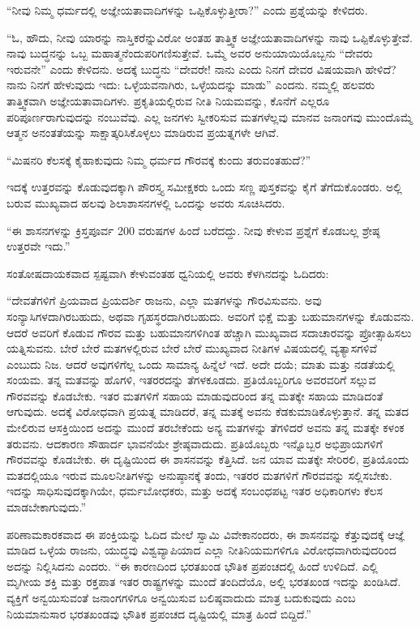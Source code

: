 “ನೀವು ನಿಮ್ಮ ಧರ್ಮದಲ್ಲಿ ಅಜ್ಞೇಯತಾವಾದಿಗಳನ್ನು ಒಪ್ಪಿಕೊಳ್ಳುತ್ತೀರಾ?” ಎಂದು ಪ್ರಶ್ನೆಯನ್ನು ಕೇಳಿದರು.

“ಓ, ಹೌದು, ನೀವು ಯಾರನ್ನು ನಾಸ್ತಿಕರೆನ್ನುವಿರೋ ಅಂತಹ ತಾತ್ತ್ವಿಕ ಅಜ್ಞೇಯತಾವಾದಿಗಳನ್ನು ನಾವು ಒಪ್ಪಿಕೊಳ್ಳುತ್ತೇವೆ. ನಾವು ಬುದ್ಧನನ್ನು ಒಬ್ಬ ಮಹಾತ್ಮನೆಂದು\break ಪರಿಗಣಿಸುತ್ತೇವೆ. ಒಮ್ಮೆ ಅವರ ಅನುಯಾಯಿಯೊಬ್ಬನು “ದೇವರು ಇರುವನೇ” ಎಂದು ಕೇಳಿದನು. ಅದಕ್ಕೆ ಬುದ್ಧನು “ದೇವರೇ! ನಾನು ಎಂದು ನಿನಗೆ ದೇವರ ವಿಷಯವಾಗಿ ಹೇಳಿದೆ? ನಾನು ನಿನಗೆ ಹೇಳುವುದು ಇದು: ಒಳ್ಳೆಯವನಾಗಿರು, ಒಳ್ಳೆಯದನ್ನು ಮಾಡು” ಎಂದನು. ನಮ್ಮಲ್ಲಿ ಹಲವರು ತಾತ್ತ್ವಿಕವಾಗಿ ಅಜ್ಞೇಯತಾವಾದಿಗಳು. ಪ್ರಕೃತಿಯಲ್ಲಿರುವ ನೀತಿ ನಿಯಮವನ್ನು, ಕೊನೆಗೆ ಎಲ್ಲರೂ ಪರಿಪೂರ್ಣರಾಗುವುದನ್ನು ನಂಬುವೆವು. ಎಲ್ಲ ಜನಗಳು ಸ್ವೀಕರಿಸುವ ಮತಗಳೆಲ್ಲವು ಮಾನವ ಜನಾಂಗವು ಮುಂದೊಮ್ಮೆ ಆತ್ಮನ ಅನಂತತೆಯನ್ನು ಸಾಕ್ಷಾತ್ಕರಿಸಿಕೊಳ್ಳಲು ಮಾಡಿರುವ ಪ್ರಯತ್ನಗಳೇ ಆಗಿವೆ.

“ಮಿಷನರಿ ಕೆಲಸಕ್ಕೆ ಕೈಹಾಕುವುದು ನಿಮ್ಮ ಧರ್ಮದ ಗೌರವಕ್ಕೆ ಕುಂದು ತರುವಂತಹುದೆ?”

ಇದಕ್ಕೆ ಉತ್ತರವನ್ನು ಕೊಡುವುದಕ್ಕಾಗಿ ಪೌರಸ್ತ್ಯ ಸಮೀಕ್ಷಕರು ಒಂದು ಸಣ್ಣ ಪುಸ್ತಕವನ್ನು ಕೈಗೆ ತೆಗೆದುಕೊಂಡರು. ಅಲ್ಲಿ ಬರುವ ಮುಖ್ಯವಾದ ಹಲವು ಶಿಲಾಶಾಸನಗಳಲ್ಲಿ ಒಂದನ್ನು ಅವರು ಸೂಚಿಸಿದರು.

“ಈ ಶಾಸನಗಳನ್ನು ಕ್ರಿಸ್ತಪೂರ್ವ 200 ವರುಷಗಳ ಹಿಂದೆ ಬರೆದದ್ದು. ನೀವು ಕೇಳುವ ಪ್ರಶ್ನೆಗೆ ಕೊಡಬಲ್ಲ ಶ್ರೇಷ್ಠ ಉತ್ತರವೇ ಇದು.”

ಸಂತೋಷದಾಯಕವಾದ ಸ್ಪಷ್ಟವಾಗಿ ಕೇಳುವಂತಹ ಧ್ವನಿಯಲ್ಲಿ ಅವರು ಕೆಳಗಿನದನ್ನು ಓದಿದರು:

“ದೇವತೆಗಳಿಗೆ ಪ್ರಿಯವಾದ ಪ್ರಿಯದರ್ಶಿ ರಾಜನು, ಎಲ್ಲಾ ಮತಗಳನ್ನು ಗೌರವಿಸುವನು. ಅವು ಸಂನ್ಯಾಸಿಗಳದಾಗಿರಬಹುದು, ಅಥವಾ ಗೃಹಸ್ಥರದಾಗಿರಬಹುದು. ಅವರಿಗೆ ಭಿಕ್ಷೆ ಮತ್ತು ಬಹುಮಾನಗಳನ್ನು ಕೊಡುವನು. ಆದರೆ ಅವರಿಗೆ ಕೊಡುವ ಗೌರವ ಮತ್ತು ಬಹುಮಾನಗಳಿಗಿಂತ ಹೆಚ್ಚಾಗಿ ಮುಖ್ಯವಾದ ಸದಾಚಾರವನ್ನು ಪ್ರೋತ್ಸಾಹಿಸಲು ಯತ್ನಿಸುವನು. ಬೇರೆ ಬೇರೆ ಮತಗಳಲ್ಲಿರುವ ಬೇರೆ ಬೇರೆ ಮುಖ್ಯವಾದ ನೀತಿಗಳ ವಿಷಯದಲ್ಲಿ ವ್ಯತ್ಯಾಸಗಳಿವೆ ಎಂಬುದು ನಿಜ. ಆದರೆ ಅವುಗಳಿಗೆಲ್ಲ ಒಂದು ಸಾಮಾನ್ಯ ಹಿನ್ನೆಲೆ ಇದೆ. ಅದೇ ದಯೆ; ಮಾತು ಮತ್ತು ನಡತೆಯಲ್ಲಿ ಸಂಯಮ. ತನ್ನ ಮತವನ್ನು ಹೊಗಳಿ, ಇತರರದನ್ನು ತೆಗಳಕೂಡದು. ಪ್ರತಿಯೊಬ್ಬರಿಗೂ ಅವರವರಿಗೆ ಸಲ್ಲುವ ಗೌರವವನ್ನು ಕೊಡಬೇಕು. ಇತರ ಮತಗಳಿಗೆ ಸಹಾಯ ಮಾಡುವುದರಿಂದ ತನ್ನ ಮತಕ್ಕೇ ಸಹಾಯ ಮಾಡಿದಂತೆ ಆಗುವುದು. ಅದಕ್ಕೆ ವಿರೋಧವಾಗಿ ಪ್ರಯತ್ನ ಮಾಡಿದರೆ, ತನ್ನ ಮತಕ್ಕೆ ಅವನು ಕೆಡಕುಮಾಡಿಕೊಳ್ಳುತ್ತಾನೆ. ತನ್ನ ಮತದ ಮೇಲಿರುವ ಆಸಕ್ತಿಯಿಂದ ಅದನ್ನು ಮುಂದೆ ತರಬೇಕೆಂದು ಅನ್ಯ ಮತಗಳನ್ನು ತೆಗಳಿದರೆ ಅವನು ತನ್ನ ಮತಕ್ಕೇ ಕಳಂಕ ತರುವನು. ಆದಕಾರಣ ಸೌಹಾರ್ದ ಭಾವನೆಯೇ ಶ್ರೇಷ್ಠವಾದುದು. ಪ್ರತಿಯೊಬ್ಬರು ಇನ್ನೊಬ್ಬರ ಅಭಿಪ್ರಾಯಗಳಿಗೆ ಗೌರವವನ್ನು ಕೊಡಬೇಕು. ಈ ದೃಷ್ಟಿಯಿಂದ ಈ ಶಾಸನವನ್ನು ಕೆತ್ತಿಸಿದೆ. ಜನ ಯಾವ ಮತಕ್ಕೇ ಸೇರಿರಲಿ, ಪ್ರತಿಯೊಂದು ಮತದಲ್ಲಿಯೂ ಇರುವ ಮೂಲನೀತಿಗಳನ್ನು ಅನುಷ್ಠಾನಕ್ಕೆ ತಂದು, ಇತರರ ಮತಗಳಿಗೆ ಗೌರವವನ್ನು ಸಲ್ಲಿಸಬೇಕು. ಇದನ್ನು ಸಾಧಿಸುವುದಕ್ಕಾಗಿಯೇ, ಧರ್ಮಬೋಧಕರು, ಮತ್ತು ಅದಕ್ಕೆ ಸಂಬಂಧಪಟ್ಟ ಇತರ ಅಧಿಕಾರಿಗಳು ಕೆಲಸ ಮಾಡಬೇಕಾಗುವುದು.”

ಪರಿಣಾಮಕಾರಕವಾದ ಈ ಪಂಕ್ತಿಯನ್ನು ಓದಿದ ಮೇಲೆ ಸ್ವಾಮಿ ವಿವೇಕಾನಂದರು, ಈ ಶಾಸನವನ್ನು ಕೆತ್ತುವುದಕ್ಕೆ ಆಜ್ಞೆ ಮಾಡಿದ ಒಳ್ಳೆಯ ರಾಜನು, ಯುದ್ಧವು ವಿಶ್ವವ್ಯಾಪಿಯಾದ ಎಲ್ಲಾ ನೀತಿನಿಯಮಗಳಿಗೂ ವಿರೋಧವಾಗಿರುವುದರಿಂದ ಅದನ್ನು ನಿಲ್ಲಿಸಿದನು ಎಂದರು. “ಈ ಕಾರಣದಿಂದ ಭರತಖಂಡ ಭೌತಿಕ ಪ್ರಪಂಚದಲ್ಲಿ ಹಿಂದೆ ಉಳಿದಿದೆ. ಎಲ್ಲಿ ಮೃಗೀಯ ಶಕ್ತಿ ಮತ್ತು ರಕ್ತಪಾತ ಇತರ ರಾಷ್ಟ್ರಗಳನ್ನು ಮುಂದೆ ತಂದಿದೆಯೊ, ಅಲ್ಲಿ ಭರತಖಂಡ ಇದನ್ನು ಖಂಡಿಸಿದೆ. ವ್ಯಕ್ತಿಗೆ ಅನ್ವಯಿಸುವಂತೆ ಜನಾಂಗಗಳಿಗೂ ಅನ್ವಯಿಸುವ ಬಲಿಷ್ಠವಾದುದು ಮಾತ್ರ ಬದುಕುವುದು ಎಂಬ ನಿಯಮಾನುಸಾರ ಭರತಖಂಡವು ಭೌತಿಕ ಪ್ರಪಂಚದ ದೃಷ್ಟಿಯಲ್ಲಿ ಮಾತ್ರ ಹಿಂದೆ ಬಿದ್ದಿದೆ.”

